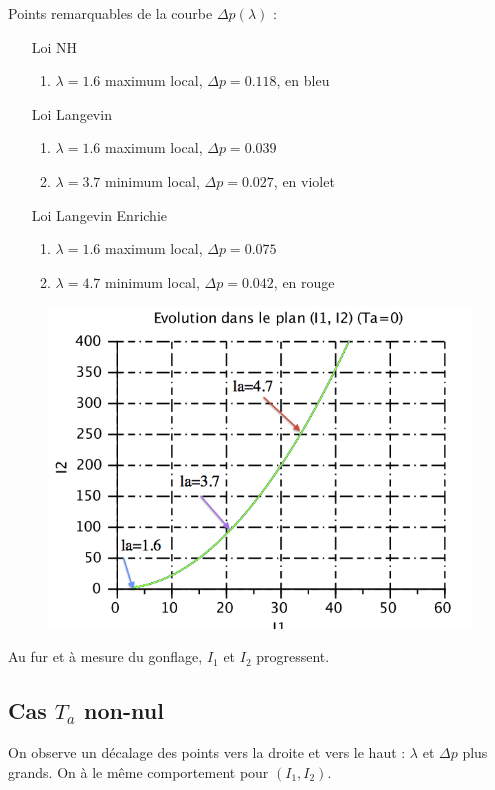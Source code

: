 \documentclass[a4paper,11pt]{article}
\begin{document}
Points remarquables de la courbe $\Delta p(\lambda)$ :
\begin{itemize}
	\item[Loi NH]
	\begin{enumerate}
	\item $\lambda = 1.6$ maximum local, $\Delta p = 0.118$, en bleu
	\end{enumerate}
	\item[Loi Langevin]
	\begin{enumerate}
	\item $\lambda = 1.6$ maximum local, $\Delta p = 0.039$
	\item $\lambda = 3.7$ minimum local, $\Delta p = 0.027$, en violet
	\end{enumerate}
	\item[Loi Langevin Enrichie]
	\begin{enumerate}
	\item $\lambda = 1.6$ maximum local, $\Delta p = 0.075$
	\item $\lambda = 4.7$ minimum local, $\Delta p = 0.042$, en rouge
	\end{enumerate}
\end{itemize}
\begin{figure}[!ht]
\centering\includegraphics[scale=1.2]{scilab/q533.png}
\end{figure}
\FloatBarrier
Au fur et à mesure du gonflage, $I_1$ et $I_2$ progressent.


\subsection{Cas $T_a$ non-nul}
On observe un décalage des points vers la droite et vers le haut : $\lambda$ et $\Delta p$ plus grands. On à le même comportement pour $(I_1, I_2)$.
\end{document}
